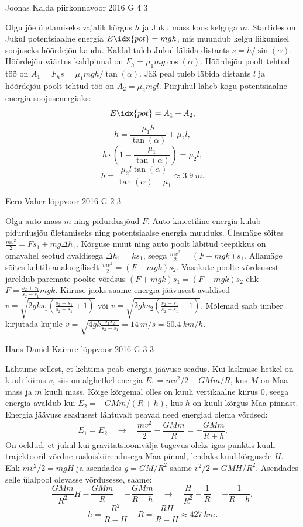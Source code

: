 \documentclass[11pt, twoside]{article}
\begin{document}
{%
{Joonas Kalda} %
{piirkonnavoor} %
{2016} %
{G 4} %
{3} %
{

\ifSolution
Olgu jõe ületamiseks vajalik kõrgus $h$ ja Juku mass koos kelguga $m$. Startides on Jukul potentsiaalne energia $E\idx{pot} = mgh$, mis muundub kelgu liikumisel soojuseks hõõrdejõu kaudu. Kaldal tuleb Jukul läbida distants $s = h/\sin(\alpha)$. Hõõrdejõu väärtus kaldpinnal on $F_h=\mu_1 mg \cos(\alpha)$. Hõõrdejõu poolt tehtud töö on $A_1 = F_h s = {\mu_1}mgh/\tan(\alpha)$. Jää peal tuleb läbida distants $l$ ja hõõrdejõu poolt tehtud töö on $A_2 = {\mu_2}mgl$. Piirjuhul läheb kogu potentsiaalne energia soojusenergiaks:
$$E\idx{pot} = A_1 + A_2,$$
$$h =\frac{\mu_1 h}{\tan(\alpha)} + {\mu_2}   l, $$
$$h \cdot \left(1 - \frac{\mu_1}{\tan(\alpha)}\right) = {\mu_2}  l,$$
$$h = \frac{\mu_2 l \tan(\alpha)}{\tan(\alpha) - {\mu_1}} \approx \SI{3.9}{m}.$$
\fi
}

{Eero Vaher} %
{lõppvoor} %
{2016} %
{G 2} %
{3} %
{

\ifSolution
Olgu auto mass $m$ ning pidurdusjõud $F$. Auto kineetiline energia kulub pidurdusjõu ületamiseks ning potentsiaalse energia muuduks. Ülesmäge sõites $\frac{mv^2}{2}=Fs_1+mg\Delta h_1$. Kõrguse muut ning auto poolt läbitud teepikkus on omavahel seotud avaldisega $\Delta h_1=ks_1$, seega $\frac{mv^2}{2}=\left(F+mgk\right)s_1$. Allamäge sõites kehtib analoogiliselt $\frac{mv^2}{2}=\left(F-mgk\right)s_2$. Vasakute poolte võrdsusest järeldub paremate poolte võrdsus $\left(F+mgk\right)s_1=\left(F-mgk\right)s_2$ ehk $F=\frac{s_2+s_1}{s_2-s_1}mgk$. Kiiruse jaoks saame energia jäävusest avaldised  $v=\sqrt{2gks_1\left(\frac{s_2+s_1}{s_2-s_1}+1\right)}$ või $v=\sqrt{2gks_2\left(\frac{s_2+s_1}{s_2-s_1}-1\right)}$. Mõlemad saab ümber kirjutada kujule $v=\sqrt{4gk\frac{s_1s_2}{s_2-s_1}}=\SI{14}{m \per s}=\SI{50.4}{km \per h}$.
\fi
}

{Hans Daniel Kaimre} %
{lõppvoor} %
{2016} %
{G 3} %
{3} %
{

\ifSolution
Lähtume sellest, et kehtima peab energia jäävuse seadus. Kui laskmise hetkel on kuuli kiirus $v$, siis on alghetkel energia $E_1 = mv^2/2 - GMm/R$, kus $M$ on Maa mass ja $m$ kuuli mass. Kõige kõrgemal olles on kuuli vertikaalne kiirus \num{0}, seega energia avaldub kui $E_2 = -GMm/(R+h)$, kus $h$ on kuuli kõrgus Maa pinnast. Energia jäävuse seadusest lähtuvalt peavad need energiad olema võrdsed:$$E_1 = E_2 \quad\rightarrow\quad \frac{mv^2}{2} - \frac{GMm}{R} = -\frac{GMm}{R+h}.$$
On öeldud, et juhul kui gravitatsioonivälja tugevus oleks igas punktis kuuli trajektooril võrdne raskuskiirendusega Maa pinnal, lendaks kuul kõrgusele $H$. Ehk $mv^2/2=mgH$ ja asendades $g=GM/R^2$ saame $v^2/2=GMH/R^2$. Asendades selle ülalpool olevasse võrdusesse, saame:
$$\frac{GMm}{R^2}H - \frac{GMm}{R} = -\frac{GMm}{R+h} \quad\rightarrow\quad \frac{H}{R^2}-\frac{1}{R} = - \frac{1}{R+h},$$
$$h=\frac{R^2}{R-H} - R = \frac{RH}{R-H} \approx \SI{427}{km}.$$
\fi
}

}
\end{document}
